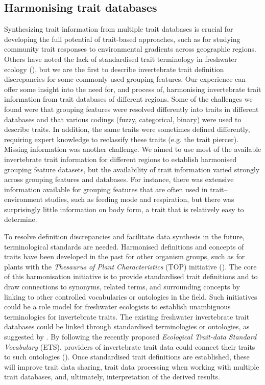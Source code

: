 \documentclass{article}
\begin{document}
\subsection{Harmonising trait databases}

Synthesizing trait information from multiple trait databases is crucial for developing the full potential of trait-based approaches, such as for studying community trait responses to environmental gradients across geographic regions. Others have noted the lack of standardised trait terminology in freshwater ecology (\cite{baird_toward_2011, brink_traits-based_2011}), but we are the first to describe invertebrate trait definition discrepancies for some commonly used grouping features. Our experience can offer some insight into the need for, and process of, harmonising invertebrate trait information from trait databases of different regions. Some of the challenges we found were that grouping features were resolved differently into traits in different databases and that various codings (fuzzy, categorical, binary) were used to describe traits. In addition, the same traits were sometimes defined differently, requiring expert knowledge to reclassify these traits (e.g. the trait piercer). Missing information was another challenge. We aimed to use most of the available invertebrate trait information for different regions to establish harmonised grouping feature datasets, but the availability of trait information varied strongly across grouping features and databases. For instance, there was extensive information available for grouping features that are often used in trait–environment studies, such as feeding mode and respiration, but there was surprisingly little information on body form, a trait that is relatively easy to determine.

To resolve definition discrepancies and facilitate data synthesis in the future, terminological standards are needed. Harmonised definitions and concepts of traits have been developed in the past for other organism groups, such as for plants with the \textit{Thesaurus of Plant Characteristics} (TOP) initiative (\cite{garnier_towards_2017}). The core of this harmonisation initiative is to provide standardised trait definitions and to draw connections to synonyms, related terms, and surrounding concepts by linking to other controlled vocabularies or ontologies in the field. Such initiatives could be a role model for freshwater ecologists to establish unambiguous terminologies for invertebrate traits. The existing freshwater invertebrate trait databases could be linked through standardised terminologies or ontologies, as suggested by \citet{baird_toward_2011}. By following the recently proposed \textit{Ecological Trait-data Standard Vocabulary} (ETS), providers of invertebrate trait data could connect their traits to such ontologies (\cite{schneider_towards_2019}). Once standardised trait definitions are established, these will improve trait data sharing, trait data processing when working with multiple trait databases, and, ultimately, interpretation of the derived results. 
\end{document}
